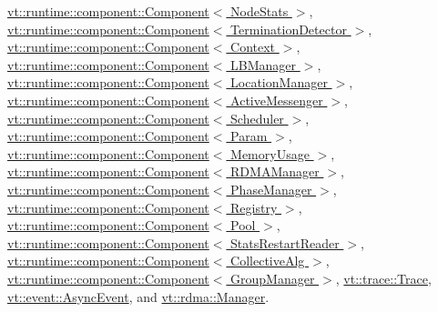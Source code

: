 \hyperlink{structvt_1_1runtime_1_1component_1_1_component_a098e362de01af6054e5491fba671a959}{vt\+::runtime\+::component\+::\+Component$<$ Node\+Stats $>$}, \hyperlink{structvt_1_1runtime_1_1component_1_1_component_a098e362de01af6054e5491fba671a959}{vt\+::runtime\+::component\+::\+Component$<$ Termination\+Detector $>$}, \hyperlink{structvt_1_1runtime_1_1component_1_1_component_a098e362de01af6054e5491fba671a959}{vt\+::runtime\+::component\+::\+Component$<$ Context $>$}, \hyperlink{structvt_1_1runtime_1_1component_1_1_component_a098e362de01af6054e5491fba671a959}{vt\+::runtime\+::component\+::\+Component$<$ L\+B\+Manager $>$}, \hyperlink{structvt_1_1runtime_1_1component_1_1_component_a098e362de01af6054e5491fba671a959}{vt\+::runtime\+::component\+::\+Component$<$ Location\+Manager $>$}, \hyperlink{structvt_1_1runtime_1_1component_1_1_component_a098e362de01af6054e5491fba671a959}{vt\+::runtime\+::component\+::\+Component$<$ Active\+Messenger $>$}, \hyperlink{structvt_1_1runtime_1_1component_1_1_component_a098e362de01af6054e5491fba671a959}{vt\+::runtime\+::component\+::\+Component$<$ Scheduler $>$}, \hyperlink{structvt_1_1runtime_1_1component_1_1_component_a098e362de01af6054e5491fba671a959}{vt\+::runtime\+::component\+::\+Component$<$ Param $>$}, \hyperlink{structvt_1_1runtime_1_1component_1_1_component_a098e362de01af6054e5491fba671a959}{vt\+::runtime\+::component\+::\+Component$<$ Memory\+Usage $>$}, \hyperlink{structvt_1_1runtime_1_1component_1_1_component_a098e362de01af6054e5491fba671a959}{vt\+::runtime\+::component\+::\+Component$<$ R\+D\+M\+A\+Manager $>$}, \hyperlink{structvt_1_1runtime_1_1component_1_1_component_a098e362de01af6054e5491fba671a959}{vt\+::runtime\+::component\+::\+Component$<$ Phase\+Manager $>$}, \hyperlink{structvt_1_1runtime_1_1component_1_1_component_a098e362de01af6054e5491fba671a959}{vt\+::runtime\+::component\+::\+Component$<$ Registry $>$}, \hyperlink{structvt_1_1runtime_1_1component_1_1_component_a098e362de01af6054e5491fba671a959}{vt\+::runtime\+::component\+::\+Component$<$ Pool $>$}, \hyperlink{structvt_1_1runtime_1_1component_1_1_component_a098e362de01af6054e5491fba671a959}{vt\+::runtime\+::component\+::\+Component$<$ Stats\+Restart\+Reader $>$}, \hyperlink{structvt_1_1runtime_1_1component_1_1_component_a098e362de01af6054e5491fba671a959}{vt\+::runtime\+::component\+::\+Component$<$ Collective\+Alg $>$}, \hyperlink{structvt_1_1runtime_1_1component_1_1_component_a098e362de01af6054e5491fba671a959}{vt\+::runtime\+::component\+::\+Component$<$ Group\+Manager $>$}, \hyperlink{structvt_1_1trace_1_1_trace_a571333fa708843b1b24079eccfc3ba93}{vt\+::trace\+::\+Trace}, \hyperlink{structvt_1_1event_1_1_async_event_a77e3aafaae98603825556cdf8105ba57}{vt\+::event\+::\+Async\+Event}, and \hyperlink{structvt_1_1rdma_1_1_manager_ad4ff20cf1ba6e870326b20900e6eb581}{vt\+::rdma\+::\+Manager}.

